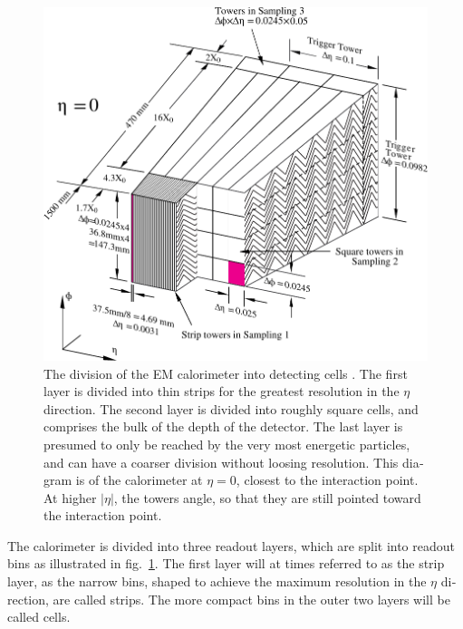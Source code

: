 \begin{english}
\begin{figure}[htp]
\begin{minipage}[b]{.69\textwidth}
\includegraphics[width=\textwidth]{caldiv}
\end{minipage}
\begin{minipage}[b]{.3\textwidth}
\caption{The division of the EM calorimeter into detecting cells \cite{egede}. The first layer is divided into thin strips for the greatest resolution in the $\eta$ direction. The second layer is divided into roughly square cells, and comprises the bulk of the depth of the detector. The last layer is presumed to only be reached by the very most energetic particles, and can have a coarser division without loosing resolution. This diagram is of the calorimeter at $\eta = 0$, closest to the interaction point. At higher $|\eta|$, the towers angle, so that they are still pointed toward the interaction point.}
\label{caldiv}
\end{minipage}
\end{figure}

The calorimeter is divided into three readout layers, which are split into readout bins as illustrated in fig.~\ref{caldiv}. The first layer will at times referred to as the strip layer, as the narrow bins, shaped to achieve the maximum resolution in the $\eta$ direction, are called strips. The more compact bins in the outer two layers will be called cells.


\end{english}
